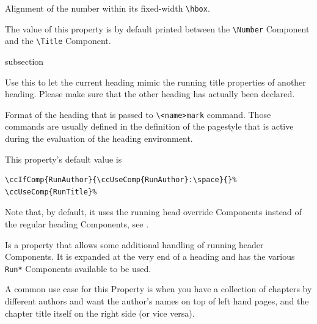 Alignment of the number within its fixed-width \lstinline{\hbox}.

%

The value of this property is by default printed between the
\lstinline{\Number} Component and the \lstinline{\Title}
Component.

\begin{Heading}[label=sec:hdg:run]{subsection}
\end{Heading}

%

Use this to let the current heading mimic the running title properties
of another heading. Please make sure that the other heading has
actually been declared.


Format of the heading that is passed to \lstinline{\<name>mark}
command. Those commands are usually defined in the definition of the
pagestyle that is active during the evaluation of the heading
environment.

This property's default value is
\begin{lstlisting}[style=tex]
\ccIfComp{RunAuthor}{\ccUseComp{RunAuthor}:\space}{}%
\ccUseComp{RunTitle}%
\end{lstlisting}
Note that, by default, it uses the running head override Components
instead of the regular heading Components, see
.


Is a property that allows some additional handling of running header
Components. It is expanded at the very end of a heading and has the
various \lstinline{Run*} Components available to be used.

A common use case for this Property is when you have a collection of
chapters by different authors and want the author's names on top of
left hand pages, and the chapter title itself on the right side (or
vice versa).

